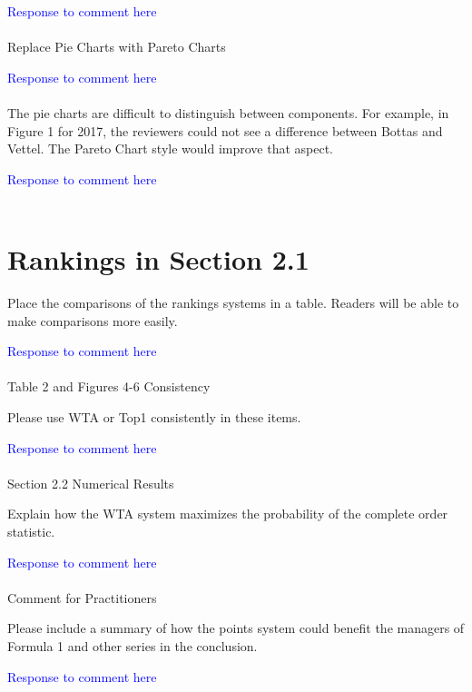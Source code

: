\documentclass[12pt]{article}
\begin{document}
\textcolor{blue}{Response to comment here}\\ \\


Replace Pie Charts with Pareto Charts

\textcolor{blue}{Response to comment here}\\ \\

The pie charts are difficult to distinguish between components. For
example, in Figure 1 for 2017, the reviewers could not see a
difference between Bottas and Vettel.  The Pareto Chart style would
improve that aspect.

\textcolor{blue}{Response to comment here}\\ \\


\section*{Rankings in Section 2.1}

Place the comparisons of the rankings systems in a table.  Readers will
be able to make comparisons more easily.

\textcolor{blue}{Response to comment here}\\ \\


Table 2 and Figures 4-6 Consistency

Please use WTA or Top1 consistently in these items.

\textcolor{blue}{Response to comment here}\\ \\

Section 2.2 Numerical Results

Explain how the WTA system maximizes the probability of the complete
order statistic.

\textcolor{blue}{Response to comment here}\\ \\


Comment for Practitioners

Please include a summary of how the points system could benefit the
managers of Formula 1 and other series in the conclusion.

\textcolor{blue}{Response to comment here}\\ \\
\end{document}
